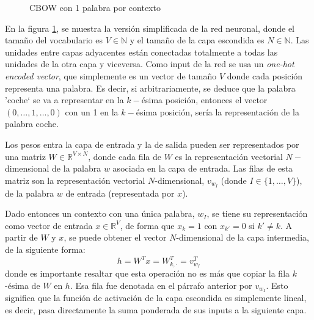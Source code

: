 \begin{figure}[ht]
\begin{tikzpicture}[
          roundnode/.style={circle, draw=black, minimum size=4mm},
      ]
  \end{tikzpicture}
  \caption{CBOW con 1 palabra por contexto}
  \label{redneuronal:3}
\end{figure}

En la figura \ref{redneuronal:3}, se muestra la versión simplificada de la red neuronal, donde el tamaño del vocabulario es $V\in\mathbb{N}$ y el tamaño de la capa escondida es $N\in\mathbb{N}$.
Las unidades entre capas adyacentes están conectadas totalmente a todas las unidades de la otra capa y viceversa. Como input de la red se usa un \textit{one-hot encoded vector},
que simplemente es un vector de tamaño $V$ donde cada posición representa una palabra. Es decir, si arbitrariamente, se deduce que la palabra 'coche` se va a representar en la $k-$ésima
posición, entonces el vector $(0, \dots, 1, \dots, 0)$ con un 1 en la $k-$ésima posición, sería la representación de la palabra coche.

Los pesos entra la capa de entrada y la de salida pueden ser representados por una matriz $W\in\mathbb{R}^{V\times N}$, donde cada fila de $W$ es la representación
vectorial $N-$dimensional de la palabra $w$ asociada en la capa de entrada. Las filas de esta matriz son la representación vectorial $N$-dimensional, $v_{w_I}$ (donde $I\in\{1, \ldots, V\}$),
de la palabra $w$ de entrada (representada por $x$).

Dado entonces un contexto con una única palabra, $w_I$, se tiene su representación como vector de entrada $x\in\mathbb{R}^V$, de forma que $x_k=1$ con $x_{k'}=0$ si $k'\neq k$. A partir de
$W$ y $x$, se puede obtener el vector $N$-dimensional de la capa intermedia, de la siguiente forma:
\begin{equation}\label{eq:h}
  h=W^Tx=W^T_{k, \cdot}=v^T_{w_I}
\end{equation}
donde es importante resaltar que esta operación no es más que copiar la fila $k$-ésima de $W$ en $h$. Esa fila fue denotada en el párrafo anterior por $v_{w_I}$.
Esto significa que la función de activación de la capa escondida es simplemente lineal, es decir, pasa directamente la suma ponderada de sus inputs a la siguiente capa.

